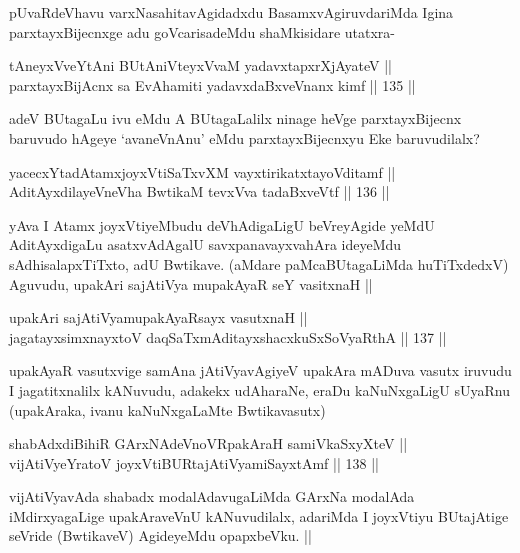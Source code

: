\begin{artha}
pUvaRdeVhavu varxNasahitavAgidadxdu BasamxvAgiruvdariMda Igina parxtayxBijecnxge adu goVcarisadeMdu shaMkisidare utatxra-
\end{artha}

\begin{shl}
tAneyxVveYtAni BUtAniVteyxVvaM yadavxtapxrXjAyateV  || \\
parxtayxBijAcnx sa EvAhamiti yadavxdaBxveVnanx kimf ||  135 ||  
\end{shl}

\begin{artha}
adeV BUtagaLu ivu eMdu A BUtagaLalilx ninage heVge parxtayxBijecnx baruvudo hAgeye `avaneVnAnu' eMdu parxtayxBijecnxyu Eke baruvudilalx?
\end{artha}

\begin{shl}
yacecxYtadAtamxjoyxVtiSaTxvXM vayxtirikatxtayoVditamf || \\
AditAyxdilayeVneVha BwtikaM tevxVva tadaBxveVtf ||  136 ||  
\end{shl}

\begin{artha}
yAva I Atamx joyxVtiyeMbudu deVhAdigaLigU beVreyAgide yeMdU AditAyxdigaLu asatxvAdAgalU savxpanavayxvahAra ideyeMdu sAdhisalapxTiTxto, adU Bwtikave. (aMdare paMcaBUtagaLiMda huTiTxdedxV) Aguvudu, upakAri sajAtiVya mupakAyaR seY vasitxnaH ||
\end{artha}

\begin{shl}
upakAri sajAtiVyamupakAyaRsayx vasutxnaH || \\
jagatayxsimxnayxtoV daqSaTxmAditayxshacxkuSxSoVyaRthA ||  137 ||  
\end{shl}

\begin{artha}
upakAyaR vasutxvige samAna jAtiVyavAgiyeV upakAra mADuva vasutx iruvudu I jagatitxnalilx kANuvudu, adakekx udAharaNe, eraDu kaNuNxgaLigU sUyaRnu (upakAraka, ivanu kaNuNxgaLaMte Bwtikavasutx)
\end{artha}

\begin{shl}
shabAdxdiBihiR GArxNAdeVnoVRpakAraH samiVkaSxyXteV ||  \\
vijAtiVyeYratoV joyxVtiBURtajAtiVyamiSayxtAmf ||  138 ||  
\end{shl}

\begin{artha}
vijAtiVyavAda shabadx modalAdavugaLiMda GArxNa modalAda iMdirxyagaLige upakAraveVnU kANuvudilalx, adariMda I joyxVtiyu BUtajAtige seVride (BwtikaveV) AgideyeMdu opapxbeVku. ||
\end{artha}

